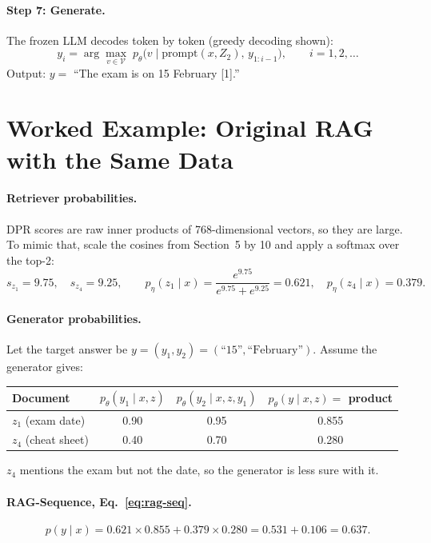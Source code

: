 \documentclass[11pt]{article}
\begin{document}
\paragraph{Step 7: Generate.}
The frozen LLM decodes token by token (greedy decoding shown):
\begin{equation}
  y_i = \arg\max_{v \in \mathcal{V}} \; p_\theta\big(v \mid \mathrm{prompt}(x, Z_2),\, y_{1:i-1}\big), \qquad i = 1, 2, \dots
\end{equation}
Output: $y =$ ``The exam is on 15 February [1].''

\section{Worked Example: Original RAG with the Same Data}

\paragraph{Retriever probabilities.}
DPR scores are raw inner products of 768-dimensional vectors, so they are large. To mimic that, scale the cosines from Section~5 by 10 and apply a softmax over the top-2:
\begin{equation}
  s_{z_1} = 9.75,\quad s_{z_4} = 9.25, \qquad
  p_\eta(z_1 \mid x) = \frac{e^{9.75}}{e^{9.75} + e^{9.25}} = 0.621,\quad
  p_\eta(z_4 \mid x) = 0.379.
\end{equation}

\paragraph{Generator probabilities.}
Let the target answer be $y = (y_1, y_2) = (\text{``15''}, \text{``February''})$. Assume the generator gives:
\begin{center}
\begin{tabular}{@{}lccc@{}}
\toprule
Document & $p_\theta(y_1 \mid x, z)$ & $p_\theta(y_2 \mid x, z, y_1)$ & $p_\theta(y \mid x, z) = $ product \\
\midrule
$z_1$ (exam date) & 0.90 & 0.95 & 0.855 \\
$z_4$ (cheat sheet) & 0.40 & 0.70 & 0.280 \\
\bottomrule
\end{tabular}
\end{center}
$z_4$ mentions the exam but not the date, so the generator is less sure with it.

\paragraph{RAG-Sequence, Eq.~\eqref{eq:rag-seq}.}
\begin{equation}
  p(y \mid x) = 0.621 \times 0.855 + 0.379 \times 0.280 = 0.531 + 0.106 = 0.637.
\end{equation}
\end{document}
